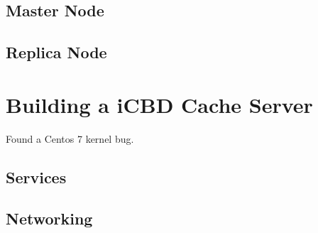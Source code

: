 

\subsection{Master Node}
\label{sub:rep_master_node}


\subsection{Replica Node}
\label{sub:rep_replica_node}






\section{Building a iCBD Cache Server}
\label{sec:cache_server}

Found a Centos 7 kernel bug.


\subsection{Services}
\label{sub:cache_services}


\subsection{Networking}
\label{sub:cache_networking}


